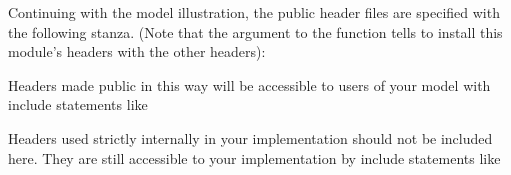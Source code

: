 \documentclass[letterpaper,10pt,english]{sphinxmanual}
\renewcommand{\sphinxcode}[1]{\texttt{\small{#1}}}
\begin{document}
Continuing with the \sphinxcode{} model illustration,
the public header files are specified with the following stanza.
(Note that the argument to the \sphinxcode{} function tells
\sphinxcode{} to install this module’s headers with the other  headers):

\begin{sphinxVerbatim}[commandchars=\\\{\}]
  

  

  \PYG{p}{[}
    \PYG{p}{]}
\end{sphinxVerbatim}

Headers made public in this way will be accessible to users of your model
with include statements like

\begin{sphinxVerbatim}[commandchars=\\\{\}]
 
\end{sphinxVerbatim}

Headers used strictly internally in your implementation should not
be included here.  They are still accessible to your implementation by
include statements like
\end{document}
